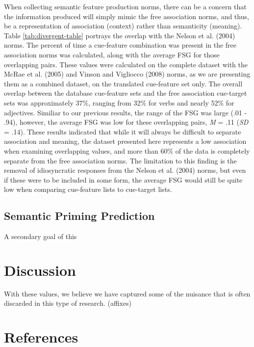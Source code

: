 \documentclass[english,man]{apa6}
\theoremstyle{definition}
\theoremstyle{definition}
\theoremstyle{definition}
\theoremstyle{remark}
\begin{document}
When collecting semantic feature production norms, there can be a
concern that the information produced will simply mimic the free
association norms, and thus, be a representation of association
(context) rather than semanticity (meaning). Table
\ref{tab:divergent-table} portrays the overlap with the Nelson et al.
(2004) norms. The percent of time a cue-feature combination was present
in the free association norms was calculated, along with the average FSG
for those overlapping pairs. These values were calculated on the
complete dataset with the McRae et al. (2005) and Vinson and Vigliocco
(2008) norms, as we are presenting them as a combined dataset, on the
translated cue-feature set only. The overall overlap between the
database cue-feature sets and the free association cue-target sets was
approximately 37\%, ranging from 32\% for verbs and nearly 52\% for
adjectives. Similiar to our previous results, the range of the FSG was
large (.01 - .94), however, the average FSG was low for these
overlapping pairs, \emph{M} = .11 (\emph{SD} = .14). These results
indicated that while it will always be difficult to separate association
and meaning, the dataset presented here represents a low association
when examining overlapping values, and more than 60\% of the data is
completely separate from the free association norms. The limitation to
this finding is the removal of idiosyncratic responses from the Nelson
et al. (2004) norms, but even if these were to be included in some form,
the average FSG would still be quite low when comparing cue-feature
lists to cue-target lists.

\subsection{Semantic Priming
Prediction}\label{semantic-priming-prediction}

A secondary goal of this

\section{Discussion}\label{discussion}

With these values, we believe we have captured some of the nuisance that
is often discarded in this type of research. (affixes)

\newpage

\section{References}\label{references}
\end{document}
